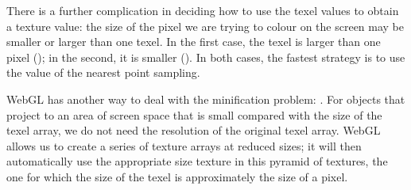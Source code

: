 \documentclass[../COS3712_Notes.tex]{subfiles}
\begin{document}
        There is a further complication in deciding how to use the texel values to obtain
        a texture value: the size of the pixel we are trying to colour on the screen
        may be smaller or larger than one texel.
        In the first case, the texel is larger than one pixel ();
        in the second, it is smaller ().
        In both cases, the fastest strategy is to use the value of the nearest point sampling.

        WebGL has another way to deal with the minification problem: .
        For objects that project to an area of screen space that is small compared with the size
        of the texel array, we do not need the resolution of the original texel array.
        WebGL allows us to create a series of texture arrays at reduced sizes;
        it will then automatically use the appropriate size texture in this pyramid of textures,
        the one for which the size of the texel is approximately the size of a pixel.
\end{document}

